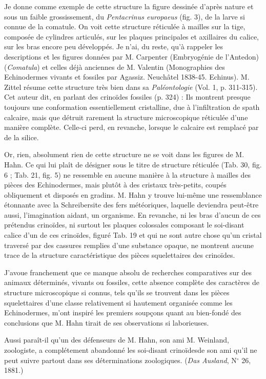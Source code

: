 \documentclass[a4paper, 12pt, oneside, french]{article}
\begin{document}
Je donne comme exemple de cette structure la figure dessinée d'après nature et sous un faible grossissement, du \emph{Pentacrinus europaeus} (fig. 3), de la larve si connue de la comatule. On voit cette structure réticulée à mailles sur la tige, composée de cylindres articulés, sur les plaques principales et axillaires du calice, sur les bras encore peu développés. Je n'ai, du reste, qu'à rappeler les descriptions et les figures données par M. Carpenter (Embryogénie de l'Antedon) (\emph{Comatula}) et celles déjà anciennes de M. Valentin (Monographies des Echinodermes vivants et fossiles par Agassiz. Neuchâtel 1838-45. Echinus). M. Zittel résume cette structure très bien dans sa \emph{Paléontologie} (Vol. 1, p. 311-315). Cet auteur dit, en parlant des crinoïdes fossiles (p. 324) : \og Ils montrent presque toujours une conformation essentiellement cristalline, due à l'infiltration de spath calcaire, mais que détruit rarement la structure microscopique réticulée d'une manière complète. Celle-ci perd, en revanche, lorsque le calcaire est remplacé par de la silice. \fg

Or, rien, absolument rien de cette structure ne se voit dans les figures de M. Hahn. Ce qui lui plaît de désigner sous le titre de \og structure réticulée \fg (Tab. 30, fig. 6 ; Tab. 21, fig. 5) ne ressemble en aucune manière à la structure à mailles des pièces des Echinodermes, mais plutôt à des cristaux très-petits, coupés obliquement et disposés en gradins. M. Hahn y trouve lui-même une ressemblance \og étonnante \fg avec la Schreibersite des fers météoriques, laquelle deviendra peut-être aussi, l'imagination aidant, un organisme. En revanche, ni les bras d'aucun de ces prétendus crinoïdes, ni surtout les plaques colossales composant le soi-disant calice d'un de ces crinoïdes, figuré Tab. 19 et qui ne sont autre chose qu'un cristal traversé par des cassures remplies d'une substance opaque, ne montrent aucune trace de la structure caractéristique des pièces squelettaires des crinoïdes.

J'avoue franchement que ce manque absolu de recherches comparatives sur des animaux déterminés, vivants ou fossiles, cette absence complète des caractères de structure microscopique si connus, tels qu'ils se trouvent dans les pièces squelettaires d'une classe relativement si hautement organisée comme les Echinodermes, m'ont inspiré les premiers soupçons quant au bien-fondé des conclusions que M. Hahn tirait de ses observations si laborieuses.

Aussi paraît-il qu'un des défenseurs de M. Hahn, son ami M. Weinland, zoologiste, a complétement abandonné les \og soi-disant crinoïdes\fg de son ami \og qu'il ne peut suivre partout dans ses déterminations zoologiques. \fg (\emph{Das Ausland}, N$^{\circ}$ 26, 1881.)
\end{document}
